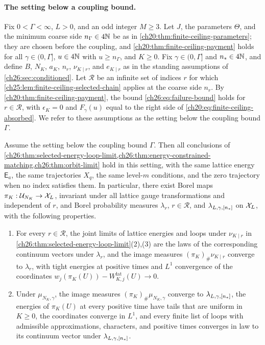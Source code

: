 \paragraph{The setting below a coupling bound.}
Fix $0<\Gamma<\infty$, $L>0$, and an odd integer $M\ge3$. Let $J$, the parameters $\Theta$, and the minimum coarse side $n_\Gamma\in4\mathbb N$ be as in \cref{ch20:thm:finite-ceiling-parameters}; they are chosen before the coupling, and \cref{ch20:thm:finite-ceiling-payment} holds for all $\gamma\in(0,\Gamma]$, $u\in4\mathbb N$ with $u\ge n_\Gamma$, and $K\ge0$. Fix $\gamma\in(0,\Gamma]$ and $n_*\in4\mathbb N$, and define $B$, $N_K$, $a_K$, $n_r$, $\nu_{K\mid r}$, and $e_{K\mid r}$ as in the standing assumptions of \cref{ch26:sec:conditioned}. Let $\mathcal R$ be an infinite set of indices $r$ for which \cref{ch25:lem:finite-ceiling-selected-chain} applies at the coarse side $n_r$. By \cref{ch20:thm:finite-ceiling-payment}, the bound \eqref{ch26:eq:failure-bound} holds for $r\in\mathcal R$, with $\epsilon_K=0$ and $F_\gamma(u)$ equal to the right side of \eqref{ch20:eq:finite-ceiling-absorbed}. We refer to these assumptions as the setting below the coupling bound $\Gamma$.

\begin{theorem}\label{ch26:thm:finite-ceiling-matching}
Assume the setting below the coupling bound $\Gamma$. Then all conclusions of \cref{ch26:thm:selected-energy-loop-limit,ch26:thm:energy-constrained-matching,ch26:thm:orbit-limit} hold in this setting, with the same lattice energy $\mathsf E_a$, the same trajectories $X_q$, the same level-$m$ conditions, and the zero trajectory when no index satisfies them. In particular, there exist Borel maps $\pi_K:\mathcal U_{N_K}\to\mathcal X_L$, invariant under all lattice gauge transformations and independent of $r$, and Borel probability measures $\lambda_r$, $r\in\mathcal R$, and $\lambda_{L,\gamma,[n_*]}$ on $\mathcal X_L$, with the following properties.
\begin{enumerate}
\item For every $r\in\mathcal R$, the joint limits of lattice energies and loops under $\nu_{K\mid r}$ in \cref{ch26:thm:selected-energy-loop-limit}(2),(3) are the laws of the corresponding continuum vectors under $\lambda_r$, and the image measures $(\pi_K)_\#\nu_{K\mid r}$ converge to $\lambda_r$, with tight energies at positive times and $L^1$ convergence of the coordinates $w_j(\pi_K(U))-W^{\mathrm{lat}}_{K,j}(U)\to0$.
\item Under $\mu_{N_K,\gamma}$, the image measures $(\pi_K)_\#\mu_{N_K,\gamma}$ converge to $\lambda_{L,\gamma,[n_*]}$, the energies of $\pi_K(U)$ at every positive time have tails that are uniform in $K\ge0$, the coordinates converge in $L^1$, and every finite list of loops with admissible approximations, characters, and positive times converges in law to its continuum vector under $\lambda_{L,\gamma,[n_*]}$.
\end{enumerate}
\end{theorem}

